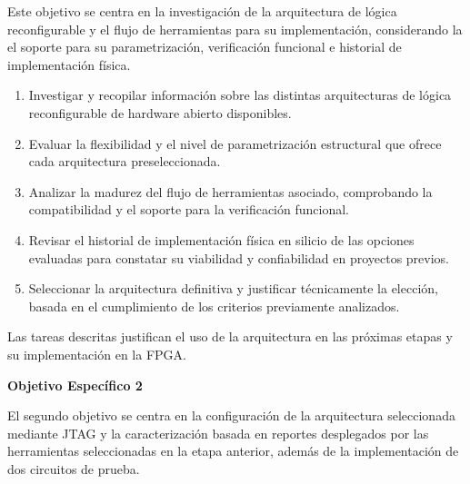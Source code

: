 Este objetivo se centra en la investigación de la arquitectura de 
lógica reconfigurable y el flujo de herramientas para su implementación, 
considerando la el soporte para su parametrización, verificación 
funcional e historial de implementación física.

\begin{enumerate}

    \item Investigar y recopilar información sobre las distintas 
    arquitecturas de lógica reconfigurable de hardware abierto 
    disponibles.
     
    \item Evaluar la flexibilidad y el nivel de parametrización 
    estructural que ofrece cada arquitectura preseleccionada.
    
    \item Analizar la madurez del flujo de herramientas asociado, 
    comprobando la compatibilidad y el soporte para la verificación 
    funcional.

    \item Revisar el historial de implementación física en silicio 
    de las opciones evaluadas para constatar su viabilidad y 
    confiabilidad en proyectos previos. 

    \item Seleccionar la arquitectura definitiva y justificar técnicamente 
    la elección, basada en el cumplimiento de los criterios previamente 
    analizados.

\end{enumerate}

Las tareas descritas justifican el uso de la arquitectura en las próximas 
etapas y su implementación en la FPGA.

\textbf{\normalsize{Objetivo Específico 2}}

El segundo objetivo se centra en la configuración de la arquitectura 
seleccionada mediante JTAG y la caracterización basada en reportes 
desplegados por las herramientas seleccionadas en la etapa anterior, 
además de la implementación de dos circuitos de prueba.

